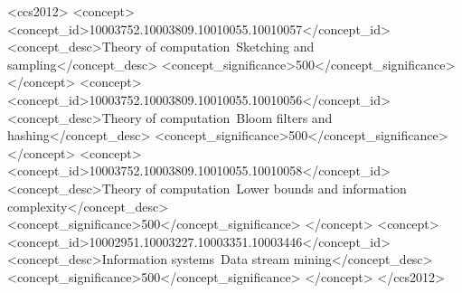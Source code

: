 \documentclass[sigconf]{acmart}
\begin{document}
\begin{CCSXML}
    <ccs2012>
        <concept>
            <concept_id>10003752.10003809.10010055.10010057</concept_id>
            <concept_desc>Theory of computation~Sketching and sampling</concept_desc>
            <concept_significance>500</concept_significance>
        </concept>
        <concept>
            <concept_id>10003752.10003809.10010055.10010056</concept_id>
            <concept_desc>Theory of computation~Bloom filters and hashing</concept_desc>
            <concept_significance>500</concept_significance>
        </concept>
        <concept>
            <concept_id>10003752.10003809.10010055.10010058</concept_id>
            <concept_desc>Theory of computation~Lower bounds and information complexity</concept_desc>
            <concept_significance>500</concept_significance>
        </concept>
        <concept>
            <concept_id>10002951.10003227.10003351.10003446</concept_id>
            <concept_desc>Information systems~Data stream mining</concept_desc>
            <concept_significance>500</concept_significance>
        </concept>
    </ccs2012>
\end{CCSXML}



\maketitle
\end{document}
